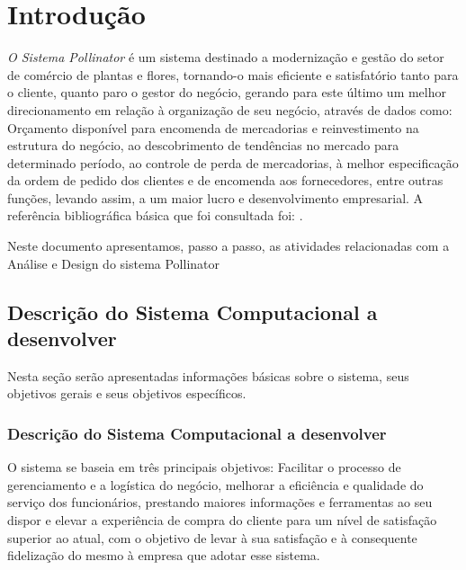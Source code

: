  
\chapter{ Introdu\c{c}\~{a}o}

\textit{ O Sistema Pollinator} \'{e} um sistema destinado a modernização e gestão do setor de com\'{e}rcio de plantas e flores, tornando-o mais eficiente e satisfatório tanto para o cliente, quanto paro o gestor do negócio, gerando para este último um melhor direcionamento em relação à organização de seu negócio, através de dados como: Orçamento disponível para encomenda de mercadorias e reinvestimento na estrutura do negócio, ao descobrimento de tendências no mercado para determinado período, ao controle de perda de mercadorias, à melhor especificação da ordem de pedido dos clientes e de encomenda aos fornecedores, entre outras funções, levando assim, a um maior lucro e desenvolvimento empresarial. A refer\^{e}ncia bibliogr\'{a}fica b\'{a}sica que foi consultada foi: \cite{Dennis2019}.

Neste documento apresentamos, passo a passo,  as atividades relacionadas com a An\'{a}lise e Design do sistema Pollinator


 \section{Descri\c{c}\~{a}o do Sistema Computacional a desenvolver}
 Nesta seção serão apresentadas informações básicas sobre o sistema, seus objetivos gerais e seus objetivos específicos.

        \subsection{Descrição do Sistema Computacional a desenvolver}
        
        O sistema se baseia em três principais objetivos: Facilitar o processo de gerenciamento e a logística do negócio, melhorar a eficiência e qualidade do serviço dos funcionários, prestando maiores informações e ferramentas ao seu dispor e elevar a experiência de compra do cliente para um nível de satisfação superior ao atual, com o objetivo de levar à sua satisfação e à consequente fidelização do mesmo à empresa que adotar esse sistema.
        
